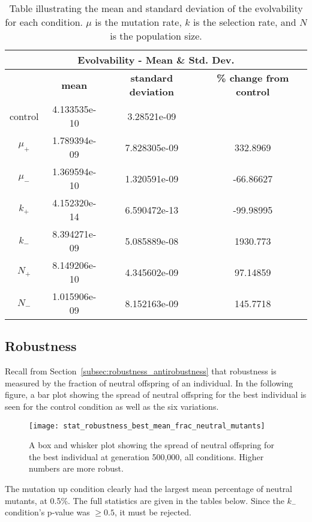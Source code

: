 \begin{table}[H]
	\centering
	\begin{tabular}{| c | c | c | c |}
		\hline
		\multicolumn{4}{c}{\Large Evolvability - Mean \& Std. Dev.} \\
		\hline
		& \textbf{mean} & \textbf{standard deviation} & \textbf{\% change from control} \\
		\hline
		\hline
		control & 4.133535e-10 & 3.28521e-09 & \textemdash \\ 
		\hline
		$\mu_+$ & 1.789394e-09 & 7.828305e-09 & 332.8969 \\ 
		\hline
		$\mu_-$ & 1.369594e-10 & 1.320591e-09 & -66.86627 \\ 
		\hline
		$k_+$ & 4.152320e-14 & 6.590472e-13 & -99.98995 \\ 
		\hline
		$k_-$ & 8.394271e-09 & 5.085889e-08 & 1930.773 \\ 
		\hline
		$N_+$ & 8.149206e-10 & 4.345602e-09 & 97.14859 \\ 
		\hline
		$N_-$ & 1.015906e-09 & 8.152163e-09 & 145.7718 \\ 
		\hline	 		 
	\end{tabular}
	\caption[Evolvability mean and standard deviation]{Table illustrating the mean and standard deviation of the evolvability for each condition. $\mu$ is the mutation rate, $k$ is the selection rate, and $N$ is the population size.}
	\label{table:mean_std_dev_evolvability}
\end{table}

\subsection{Robustness}
Recall from Section~\ref{subsec:robustness_antirobustness} that robustness is measured by the fraction of neutral offspring of an individual. In the following figure, a bar plot showing the spread of neutral offspring for the best individual is seen for the control condition as well as the six variations. 

\begin{figure}[H]
	\centering
	\texttt{[image: stat\_robustness\_best\_mean\_frac\_neutral\_mutants]}
	\caption[Robustness box and whisker plot]{A box and whisker plot showing the spread of neutral offspring for the best individual at generation 500,000, all conditions. Higher numbers are more robust.}
	\label{fig:mean_robustness_all_conditions}
\end{figure}
The mutation up condition clearly had the largest mean percentage of neutral mutants, at 0.5\%. The full statistics are given in the tables below. Since the $k_-$ condition's p-value was $\geq0.5$, it must be rejected.

